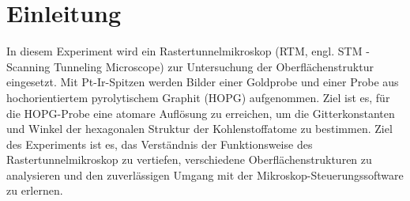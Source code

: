 \chapter{Einleitung}

In diesem Experiment wird ein Rastertunnelmikroskop (RTM, engl. STM - Scanning Tunneling Microscope) zur Untersuchung der Oberflächenstruktur eingesetzt. 
Mit Pt-Ir-Spitzen werden Bilder einer Goldprobe und einer Probe aus hochorientiertem pyrolytischem Graphit (HOPG) aufgenommen. Ziel ist es, für die HOPG-Probe eine atomare Auflösung zu erreichen, um die Gitterkonstanten und Winkel der hexagonalen Struktur der Kohlenstoffatome zu bestimmen. Ziel des Experiments ist es, das Verständnis der Funktionsweise des Rastertunnelmikroskop zu vertiefen, verschiedene Oberflächenstrukturen zu analysieren und den zuverlässigen Umgang mit der Mikroskop-Steuerungssoftware zu erlernen.